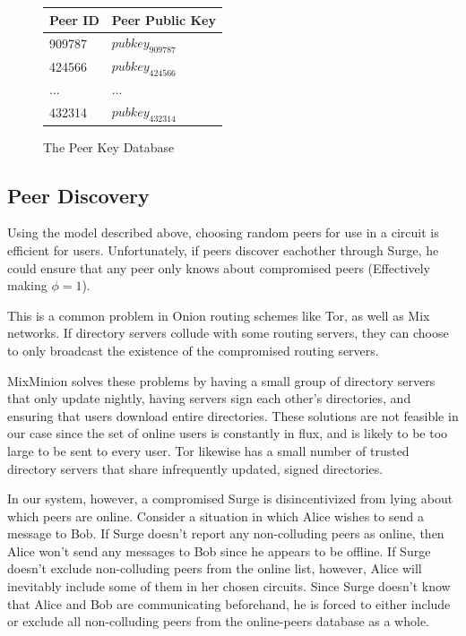 \documentclass[twocolumn,11pt,english]{article}
\begin{document}
\begin{figure}[ht]
  \centering
\begin{tabular}{| l | l | }
  \hline
  Peer ID & Peer Public Key  \\ \hline
  909787 & $pubkey_{909787}$ \\ \hline
  424566 & $pubkey_{424566}$ \\ \hline
  ... & ... \\ \hline
  432314 & $pubkey_{432314}$  \\ \hline
\end{tabular}
\caption{The Peer Key Database}
\label{peerKeyDB}
\end{figure}

\subsection{Peer Discovery}
\label{sec:PeerDiscovery}
Using the model described above, choosing random peers for use in a circuit is efficient for users.  Unfortunately, if peers discover eachother through Surge, he could ensure that any peer only knows about compromised peers (Effectively making $\phi = 1$).

This is a common problem in Onion routing schemes like Tor, as well as Mix networks. If directory servers collude with some routing servers, they can choose to only broadcast the existence of the compromised routing servers.

MixMinion \cite{minion-design} solves these problems by having a small group of directory servers that only update nightly, having servers sign each other's directories, and ensuring that users download entire directories. These solutions are not feasible in our case since the set of online users is constantly in flux, and is likely to be too large to be sent to every user. Tor \cite{tor-design} likewise has a small number of trusted directory servers that share infrequently updated, signed directories.

In our system, however, a compromised Surge is disincentivized from lying about which peers are online. Consider a situation in which Alice wishes to send a message to Bob. If Surge doesn't report any non-colluding peers as online, then Alice won't send any messages to Bob since he appears to be offline. If Surge doesn't exclude non-colluding peers from the online list, however, Alice will inevitably include some of them in her chosen circuits. Since Surge doesn't know that Alice and Bob are communicating beforehand, he is forced to either include or exclude all non-colluding peers from the online-peers database as a whole. 
\end{document}
